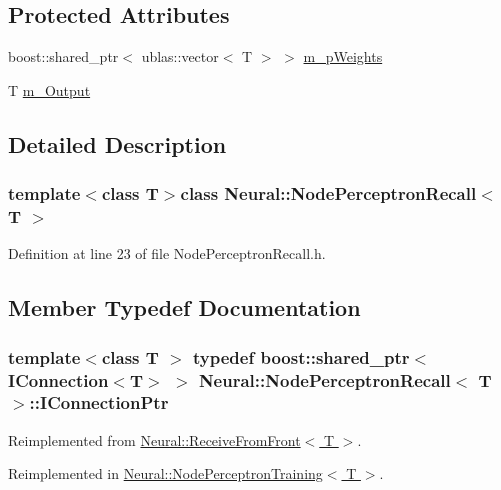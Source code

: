 \subsection*{Protected Attributes}
\begin{DoxyCompactItemize}
\item 
boost::shared\_\-ptr$<$ ublas::vector$<$ T $>$ $>$ \hyperlink{class_neural_1_1_node_perceptron_recall_afae4b24a101bd200700831b537e3b9c9}{m\_\-pWeights}
\item 
T \hyperlink{class_neural_1_1_node_perceptron_recall_a0dc6cbbf1cdd0dc55b171e40ed183b6d}{m\_\-Output}
\end{DoxyCompactItemize}


\subsection{Detailed Description}
\subsubsection*{template$<$class T$>$class Neural::NodePerceptronRecall$<$ T $>$}



Definition at line 23 of file NodePerceptronRecall.h.



\subsection{Member Typedef Documentation}
\hypertarget{class_neural_1_1_node_perceptron_recall_a3810ccef790454bbb05dcb86a1743d30}{
\subsubsection[{IConnectionPtr}]{\setlength{\rightskip}{0pt plus 5cm}template$<$class T $>$ typedef boost::shared\_\-ptr$<$ {\bf IConnection}$<$T$>$ $>$ {\bf Neural::NodePerceptronRecall}$<$ T $>$::{\bf IConnectionPtr}}}
\label{class_neural_1_1_node_perceptron_recall_a3810ccef790454bbb05dcb86a1743d30}


Reimplemented from \hyperlink{class_neural_1_1_receive_from_front_abf496040ce9745e7e1fc8274f9492295}{Neural::ReceiveFromFront$<$ T $>$}.



Reimplemented in \hyperlink{class_neural_1_1_node_perceptron_training_acf502a8079c8e875773ac940986af738}{Neural::NodePerceptronTraining$<$ T $>$}.



